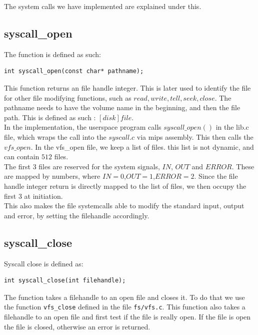 \documentclass[11pt]{article}
\begin{document}
The system calls we have implemented are explained under this.


\subsection{syscall\_open}
The function is defined as such:
    \begin{lstlisting}[style=customc]
int syscall_open(const char* pathname);
    \end{lstlisting}

This function returns an file handle integer. This is later used to identify 
the file for other file modifying functions, such as $read,write,tell,seek,close$.
The pathname needs to have the volume name in the beginning, and then the file path.
This is defined as such : $[disk]file$.\\

In the implementation, the userspace program calls $syscall\_open()$ in the lib.c file, which wraps the call
into the $syscall.c$ via mips assembly. This then calls the $vfs\_open$. In the vfs\_open file, we keep a list of files.
this list is not dynamic, and can contain $512$ files. \\

The first 3 files are reserved for the system signals, $IN$, $OUT$ and $ERROR$. These are mapped by numbers, where $IN=0$,$OUT=1$,$ERROR=2$. Since the file handle integer return is directly mapped to the list of files, we then occupy the first 3 at initiation. \\

This also makes the file systemcalls able to modify the standard input, output and error, by setting the filehandle accordingly.




\subsection{syscall\_close}
Syscall close is defined as:

    \begin{lstlisting}[style=customc]
int syscall_close(int filehandle);
    \end{lstlisting}

The function takes a filehandle to an open file and closes it.  To do that we
use the function \texttt{vfs\_close} defined in the file \texttt{fs/vfs.c}.  This
function also takes a filehandle to an open file and first test if the
file is really open.  If the file is open the file is closed, otherwise an error
is returned. \\
\end{document}
